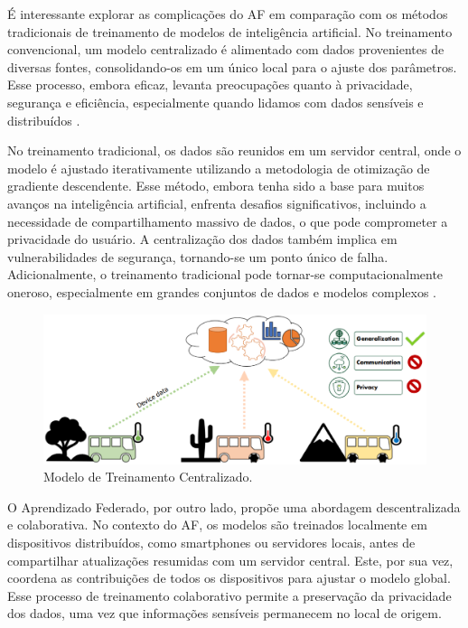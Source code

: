 É interessante explorar as complicações do AF em comparação com os métodos tradicionais de treinamento de modelos de inteligência artificial. No treinamento convencional, um modelo centralizado é alimentado com dados provenientes de diversas fontes, consolidando-os em um único local para o ajuste dos parâmetros. Esse processo, embora eficaz, levanta preocupações quanto à privacidade, segurança e eficiência, especialmente quando lidamos com dados sensíveis e distribuídos \cite{goodfellow2016deep}.

No treinamento tradicional, os dados são reunidos em um servidor central, onde o modelo é ajustado iterativamente utilizando a metodologia de otimização de gradiente descendente. Esse método, embora tenha sido a base para muitos avanços na inteligência artificial, enfrenta desafios significativos, incluindo a necessidade de compartilhamento massivo de dados, o que pode comprometer a privacidade do usuário. A centralização dos dados também implica em vulnerabilidades de segurança, tornando-se um ponto único de falha. Adicionalmente, o treinamento tradicional pode tornar-se computacionalmente oneroso, especialmente em grandes conjuntos de dados e modelos complexos \cite{sutskever2013importance}.

\begin{figure}[ht]
    \centering
    \includegraphics[scale=0.50]{figuras/teorica/TraditionalCentralizedLearning.eps}
    \caption{Modelo de Treinamento Centralizado.}
    \label{fig:TraditionalCentralizedLearning}
\end{figure}

O Aprendizado Federado, por outro lado, propõe uma abordagem descentralizada e colaborativa. No contexto do AF, os modelos são treinados localmente em dispositivos distribuídos, como smartphones ou servidores locais, antes de compartilhar atualizações resumidas com um servidor central. Este, por sua vez, coordena as contribuições de todos os dispositivos para ajustar o modelo global. Esse processo de treinamento colaborativo permite a preservação da privacidade dos dados, uma vez que informações sensíveis permanecem no local de origem\cite{mcmahan2017communication}.

